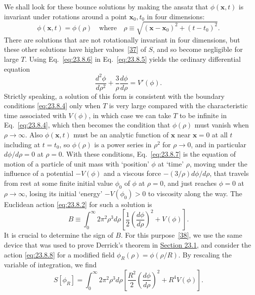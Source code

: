 We shall look for these bounce solutions by making the ansatz that $\phi(\mathbf x,t)$ is invariant under rotations around a point $\mathbf x_0,t_0$ in four dimensions:
\begin{equation}
 \phi(\mathbf x,t)=\phi(\rho)
 \quad\text{where}\quad
 \rho\equiv\sqrt{(\mathbf x-\mathbf x_0)^2+(t-t_0)^2}.
 \tag{23.8.6}\label{eq:23.8.6}
\end{equation}
There are solutions that are not rotationally invariant in four dimensions, but these other solutions have higher values~\hyperref[ch23-ref-37]{[37]} of $S$, and so become negligible for large $T$. Using Eq.~\eqref{eq:23.8.6} in Eq.~\eqref{eq:23.8.5} yields the ordinary differential equation
\begin{equation}
 \frac{d^2\phi}{d\rho^2}+\frac{3}{\rho}\frac{d\phi}{d\rho}=V'(\phi).
 \tag{23.8.7}\label{eq:23.8.7}
\end{equation}
Strictly speaking, a solution of this form is consistent with the boundary conditions \eqref{eq:23.8.4} only when $T$ is very large compared with the characteristic time associated with $V(\phi)$, in which case we can take $T$ to be infinite in Eq.~\eqref{eq:23.8.4}, which then becomes the condition that $\phi(\rho)$ must vanish when $\rho\to\infty$. Also $\phi(\mathbf x,t)$ must be an analytic function of $\mathbf x$ near $\mathbf x=0$ at all $t$ including at $t=t_0$, so $\phi(\rho)$ is a power series in $\rho^2$ for $\rho\to0$, and in particular $d\phi/d\rho=0$ at $\rho=0$. With these conditions, Eq.~\eqref{eq:23.8.7} is the equation of motion of a particle of unit mass with `position' $\phi$ at `time' $\rho$, moving under the influence of a potential $-V(\phi)$ and a viscous force $-(3/\rho)d\phi/d\rho$, that travels from rest at some finite initial value $\phi_0$ of $\phi$ at $\rho=0$, and just reaches $\phi=0$ at $\rho\to\infty$, losing its initial `energy' $-V(\phi_0)>0$ to viscosity along the way. The Euclidean action \eqref{eq:23.8.2} for such a solution is
\begin{equation}
 B\equiv\int_0^\infty 2\pi^2\rho^3d\rho
 \left[
 \frac{1}{2}\left(\frac{d\phi}{d\rho}\right)^2+V(\phi)
 \right].
 \tag{23.8.8}\label{eq:23.8.8}
\end{equation}
It is crucial to determine the sign of $B$. For this purpose~\hyperref[ch23-ref-38]{[38]}, we use the same device that was used to prove Derrick's theorem in \hyperref[sec:23.1]{Section 23.1}, and consider the action \eqref{eq:23.8.8} for a modified field $\phi_R(\rho)=\phi(\rho/R)$. By rescaling the variable of integration, we find
\begin{equation}
 S[\phi_R]=\int_0^\infty 2\pi^2\rho^3d\rho
 \left[
 \frac{R^2}{2}\left(\frac{d\phi}{d\rho}\right)^2+R^4V(\phi)
 \right].
 \tag{23.8.9}\label{eq:23.8.9}
\end{equation}
